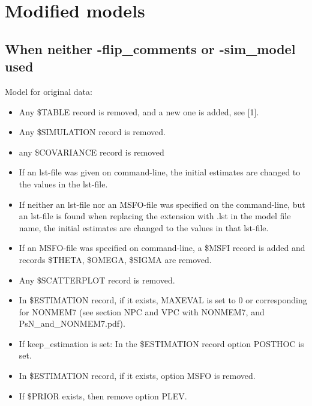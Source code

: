 \section{Modified models}

\subsection{When neither -flip\_comments or -sim\_model used}
Model for original data:  
\begin{itemize}
	\item Any \$TABLE record is removed, and a new one is added, see [1].
	\item Any \$SIMULATION record is removed.
	\item any \$COVARIANCE record is removed
	\item If an lst-file was given on command-line, the initial estimates are changed to the values in the lst-file. 
	\item If neither an lst-file nor an MSFO-file was specified on the command-line, but an lst-file is found when replacing the extension with .lst in the model file name, the initial estimates are changed to the values in that lst-file.
	\item If an MSFO-file was specified on command-line, a \$MSFI record is added and records \$THETA, \$OMEGA, \$SIGMA are removed.  
	\item Any \$SCATTERPLOT record is removed.
	\item In \$ESTIMATION record, if it exists, MAXEVAL is set to 0 or corresponding for  NONMEM7 (see section NPC and VPC with NONMEM7, and PsN\_and\_NONMEM7.pdf). 
	\item If keep\_estimation is set: In the \$ESTIMATION record option POSTHOC is set.
	\item In \$ESTIMATION record, if it exists, option MSFO is removed.
	\item If \$PRIOR exists, then remove option PLEV.
\end{itemize}

